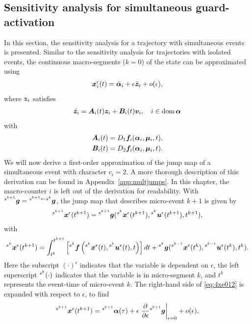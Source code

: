 \documentclass[../DC2017114Bouma.tex]{subfiles}
\begin{document}
\subsection{Sensitivity analysis for simultaneous guard-activation}
In this section, the sensitivity analysis for a trajectory with simultaneous events is presented. Similar to the sensitivity analysis for trajectories with isolated events, the continuous macro-segments ($k=0$) of the state can be approximated using
\begin{align}
{\boldsymbol{x}}_i^\epsilon(t) = \bar{\boldsymbol{\alpha}}_i + \epsilon\bar{{\boldsymbol{z}}}_i + o(\epsilon),
\end{align}
where ${\boldsymbol{z}}_i$ satisfies
\begin{align}
\dot{{\boldsymbol{z}}}_i = {\boldsymbol{A}}_i(t){\boldsymbol{z}}_i +{\boldsymbol{B}}_i(t){\boldsymbol{v}}_i,\quad i\in \operatorname{\textnormal{dom}}\boldsymbol{\alpha}
\end{align}
with
\begin{align*}
{\boldsymbol{A}}_i(t) &= D_1{\boldsymbol{f}}_i(\boldsymbol{\alpha}_i,\boldsymbol{\mu}_i,t),\\
{\boldsymbol{B}}_i(t) &= D_2{\boldsymbol{f}}_i(\boldsymbol{\alpha}_i,\boldsymbol{\mu}_i,t).
\end{align*}
We will now derive a first-order approximation of the jump map of a simultaneous event with character $c_i = 2$. A more thorough description of this derivation can be found in Appendix~\ref{app:multjumps}. In this chapter, the macro-counter $i$ is left out of the derivation for readability. With $\hspace{0cm}^{s^{k+1}}{\boldsymbol{g}} = \hspace{0cm}^{s^{k+1}\leftarrow s^k}{\boldsymbol{g}}$, the jump map that describes micro-event $k+1$ is given by
\begin{align}
\hspace{0cm}^{s^{k+1}}{\boldsymbol{x}}^\epsilon(t^{k+1}) = \hspace{0cm}^{s^{k+1}}{\boldsymbol{g}}(\hspace{0cm}^{s^{k}}{\boldsymbol{x}}^\epsilon(t^{k+1}),\hspace{0cm}^{s^{k}}{\boldsymbol{u}}^\epsilon(t^{k+1}),t^{k+1}),\label{eq:4xe012}
\end{align}
with
\begin{align}
\hspace{0cm}^{s^{k}}{\boldsymbol{x}}^\epsilon(t^{k+1}) = \int_{t^{k}}^{t^{k+1}}\left[\hspace{0cm}^{s^{k}}{\boldsymbol{f}}\left(\hspace{0cm}^{s^{k}}{\boldsymbol{x}}^\epsilon(t),\hspace{0cm}^{s^{k}}{\boldsymbol{u}}^\epsilon(t),t\right)\right]dt + \hspace{0cm}^{s^{k}}{\boldsymbol{g}}(\hspace{0cm}^{s^{k-1}}{\boldsymbol{x}}^\epsilon(t^{k}),\hspace{0cm}^{s^{k-1}}{\boldsymbol{u}}^\epsilon(t^{k}),t^{k}).\label{eq:4xe01}
\end{align}
Here the subscript $(\cdot)^\epsilon$ indicates that the variable is dependent on $\epsilon$, the left superscript $\hspace{0cm}^{s^k}(\cdot)$ indicates that the variable is in micro-segment $k$, and $t^k$ represents the event-time of micro-event $k$. The right-hand side of \eqref{eq:4xe012} is expanded with respect to $\epsilon$, to find
\begin{align}
\hspace{0cm}^{s^{k+1}}{\boldsymbol{x}}^\epsilon(t^{k+1}) = \hspace{0cm}^{s^{k+1}}\boldsymbol{\alpha}(\tau) + \epsilon\left.\frac{\partial}{\partial\epsilon}\hspace{0cm}^{s^{k+1}}{\boldsymbol{g}}\right|_{\epsilon=0} + o(\epsilon),\label{eq:4xe012exp}
\end{align}
\end{document}
